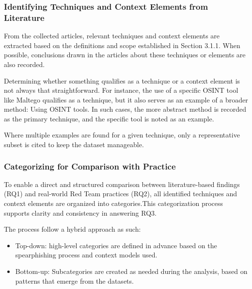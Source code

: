 \subsubsection{Identifying Techniques and Context Elements from Literature}
From the collected articles, relevant techniques and context elements are extracted based on the definitions and scope established in Section 3.1.1. When possible, conclusions drawn in the articles about these techniques or elements are also recorded.

Determining whether something qualifies as a technique or a context element is not always that straightforward. For instance, the use of a specific OSINT tool like Maltego qualifies as a technique, but it also serves as an example of a broader method: Using OSINT tools. In such cases, the more abstract method is recorded as the primary technique, and the specific tool is noted as an example.

Where multiple examples are found for a given technique, only a representative subset is cited to keep the dataset manageable.

\subsubsection{Categorizing for Comparison with Practice}
To enable a direct and structured comparison between literature-based findings (RQ1) and real-world Red Team practices (RQ2), all identified techniques and context elements are organized into categories.This categorization process supports clarity and consistency in answering RQ3.

The process follow a hybrid approach as such:
\begin{itemize}
    \item Top-down: high-level categories are defined in advance based on the spearphishing process and context models used.
    \item Bottom-up: Subcategories are created as needed during the analysis, based on patterns that emerge from the datasets.
\end{itemize}

